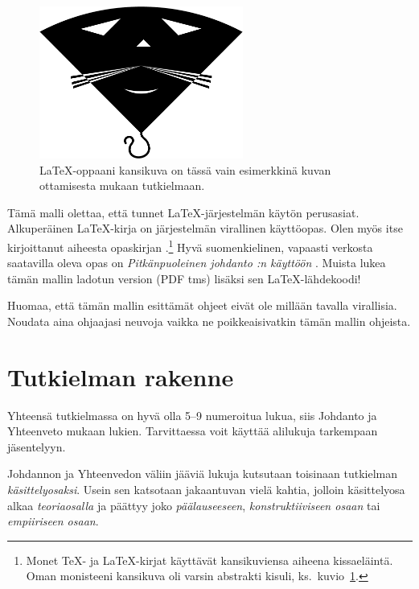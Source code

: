 \documentclass[utf8]{gradu3-tjt}
\begin{document}
\begin{figure}[h]\centering
  \includegraphics[height=5cm,keepaspectratio]{opus-kissa}
  \caption[\LaTeX-oppaani \parencite{kaijanaho03:_latex_ams_latex}
  kansikuva]{\LaTeX-oppaani \parencite{kaijanaho03:_latex_ams_latex}
    kansikuva on tässä vain esimerkkinä kuvan ottamisesta mukaan
    tutkielmaan.}
  \label{fig:opus-kissa}
\end{figure}

Tämä malli olettaa, että tunnet \LaTeX-järjestelmän käytön perusasiat.
Alkuperäinen \LaTeX-kirja \parencite{lamport94:_latex} on järjestelmän
virallinen käyttöopas.  Olen myös itse kirjoittanut aiheesta
opaskirjan \parencite{kaijanaho03:_latex_ams_latex}.\footnote{Monet
  \TeX- ja \LaTeX-kirjat käyttävät kansikuviensa aiheena kissaeläintä.
  Oman monisteeni kansikuva oli varsin abstrakti kisuli,
  ks.~kuvio~\ref{fig:opus-kissa}.}  Hyvä suomenkielinen, vapaasti
verkosta saatavilla oleva opas on \textit{Pitkänpuoleinen johdanto
  \LaTeXe:n käyttöön} \parencite{oetiker:_pitka_latex}.  Muista lukea
tämän mallin ladotun version (PDF tms) lisäksi sen \LaTeX-lähdekoodi!

Huomaa, että tämän mallin esittämät ohjeet eivät ole millään tavalla
virallisia.  Noudata aina ohjaajasi neuvoja vaikka ne poikkeaisivatkin
tämän mallin ohjeista.

\chapter{Tutkielman rakenne}

Yhteensä tutkielmassa on hyvä olla 5--9 numeroitua
lukua, siis Johdanto ja Yhteenveto mukaan lukien.  Tarvittaessa voit
käyttää alilukuja tarkempaan jäsentelyyn.

Johdannon ja Yhteenvedon väliin jääviä lukuja kutsutaan toisinaan
tutkielman \textit{käsittelyosaksi}.  Usein sen katsotaan jakaantuvan
vielä kahtia, jolloin käsittelyosa alkaa \textit{teoriaosalla} ja
päättyy joko \textit{päälauseeseen}, \textit{konstruktiiviseen osaan}
tai \textit{empiiriseen osaan}.
\end{document}
